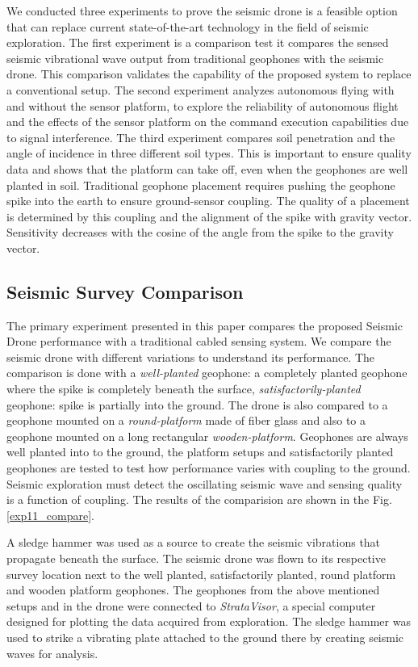 We conducted three experiments to prove the seismic drone is a feasible option that can replace current state-of-the-art technology in the field of seismic exploration. The first experiment is a comparison test it compares the sensed seismic vibrational wave output from traditional geophones with the seismic drone. This comparison validates the capability  of the proposed system to replace a conventional setup. The second experiment analyzes autonomous flying with and without the sensor platform, to explore the reliability of autonomous flight and the effects of the sensor platform on the command execution capabilities due to signal interference. The third experiment compares soil penetration and the angle of incidence in three different soil types. This is important to ensure quality data and shows that the platform can take off, even when the geophones are well planted in soil. Traditional geophone placement requires pushing the geophone spike into the earth to ensure ground-sensor coupling. The quality of a placement is determined by this coupling and the alignment of the spike with gravity vector. Sensitivity decreases with the cosine of the angle from the spike to the gravity vector.

\subsection{Seismic Survey Comparison}

The primary experiment presented in this paper compares the proposed Seismic Drone performance with a traditional cabled sensing system. We compare the seismic drone with different variations to understand its performance. The comparison is done with a \emph{well-planted} geophone: a completely planted geophone where the spike is completely beneath the surface,    \emph{satisfactorily-planted} geophone: spike is partially into the ground. The drone is also compared to a geophone mounted on a \emph{round-platform} made of fiber glass and also to a geophone mounted on a long rectangular \emph{wooden-platform}. Geophones are always well planted into to the ground, the platform setups and satisfactorily planted geophones are tested to test how performance varies with coupling to the ground. Seismic exploration must detect the oscillating seismic wave and sensing quality is a function of coupling. The results of the comparision are shown in the Fig. \ref{exp11_compare}.

A sledge hammer was used as a source to create the seismic vibrations that propagate beneath the surface. The seismic drone was flown to its respective survey location next to the well planted, satisfactorily planted, round platform and wooden platform geophones. The geophones from the above mentioned setups and in the drone were connected to \emph{StrataVisor}, a special computer designed for plotting the data acquired from exploration. The sledge hammer was used to strike a vibrating plate attached to the ground there by creating seismic waves for analysis.

